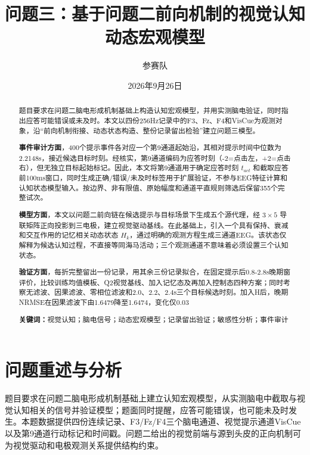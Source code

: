 \documentclass[UTF8,a4paper,12pt]{ctexart}
\title{问题三：基于问题二前向机制的视觉认知动态宏观模型}
\author{参赛队}
\date{2026年9月26日}
\begin{document}
\maketitle

\begin{abstract}
题目要求在问题二脑电形成机制基础上构造认知宏观模型，并用实测脑电验证，同时指出应答可能错误或未及时。本文以四份256Hz记录中的F3、Fz、F4和VisCue为观测对象，沿“前向机制衔接、动态状态构造、整份记录留出检验”建立问题三模型。

\textbf{事件审计方面}，400个提示事件各对应一个第9通道起始沿，其相对提示时间中位数为2.2148s，接近候选目标时刻。经核实，第9通道编码为应答时刻（-2=点击左，+2=点击右），但无独立目标起始标记。因此，本文将第9通道用于确定应答时刻 \(t_{act}\) 和截取应答前100ms窗口，同时生成正确/错误/未及时标签用于扩展验证，不参与EEG特征计算和认知状态模型输入。按边界、非有限值、原始幅度和通道平直规则筛选后保留355个完整试次。

\textbf{模型方面}，本文以问题二前向链在候选提示与目标场景下生成五个源代理，经 \(3\times 5\) 导联矩阵正向投影到三电极，建立视觉驱动基线。在此基础上，引入一个具有保持、衰减和交互作用的记忆相关动态状态 \(H_k\)，通过明确的观测方程生成三通道EEG。该状态仅解释为候选认知过程，不直接等同海马活动；三个观测通道不意味着必须设置三个认知状态。

\textbf{验证方面}，每折完整留出一份记录，用其余三份记录拟合，在固定提示后0.8-2.8s晚期窗评价，比较训练均值模板、Q2视觉基线、加入记忆态及再加入控制态四种方案；同时考察无滤波、因果滤波、零相位滤波和2.0、2.2、2.4s三个目标候选时刻。加入H后，晚期NRMSE在因果滤波下由1.6479降至1.6474，变化仅0.03%

\noindent\textbf{关键词：}视觉认知；脑电信号；动态宏观模型；记录留出验证；敏感性分析；事件审计
\end{abstract}

\section{问题重述与分析}

题目要求在问题二脑电形成机制基础上建立认知宏观模型，从实测脑电中截取与视觉认知相关的信号并验证模型；题面同时提醒，应答可能错误，也可能未及时发生。本题数据提供四份连续记录、F3/Fz/F4三个脑电通道、视觉提示通道VisCue以及第9通道行动标记和时间戳。问题二给出的视觉前端与源到头皮的正向机制可为视觉驱动和电极观测关系提供结构约束。
\end{document}
